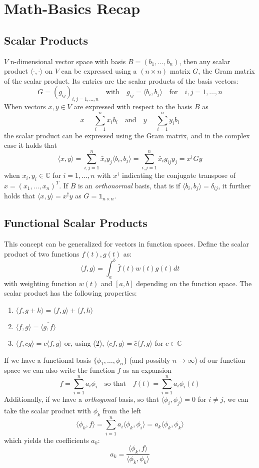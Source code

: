 \section*{Math-Basics Recap}
\subsection*{Scalar Products}
$V$ n-dimensional vector space with basis $B = (b_1, \dots, b_n)$, then any scalar product $\langle\cdot,\cdot\rangle$ on $V$ can be expressed using a $(n \times n)$ matrix $G$, the Gram matrix of the scalar product. Its entries are the scalar products of the basis vectors:
$$ G = (g_{ij})_{i,j=1,\dots,n} \quad \text{with} 
  \quad g_{ij} = \langle b_i, b_j \rangle \quad \text{for}
  \quad i,j = 1,\dots, n $$
When vectors $x,y \in V$ are expressed with respect to the basis $B$ as
$$ x = \sum_{i=1}^n x_i b_i \quad \text{and} \quad y = \sum_{i=1}^n y_i b_i $$
the scalar product can be expressed using the Gram matrix, and in the complex case it holds that
$$ \langle x, y \rangle = \sum^n_{i,j=1} \bar{x}_i y_j \langle b_i, b_j \rangle 
  =\sum^n_{i,j=1} \bar{x}_i g_{ij} y_j = x^\dagger G y$$
when $x_i,y_i \in \mathbb{C}$ for $i=1,\dots,n$ with $x^\dagger$ indicating the conjugate transpose of $x = (x_1, \dots, x_n)^T$. If $B$ is an \textit{orthonormal} basis, that is if $\langle b_i, b_j \rangle = \delta_{ij}$, it further holds that $\langle x,y \rangle = x^\dagger y$ as $G = \mathbb{1}_{n \times n}$.


\subsection*{Functional Scalar Products}
This concept can be generalized for vectors in function spaces. Define the scalar product of two functions $f(t), g(t)$ as:
$$ \langle f, g \rangle = \int_a^b \bar{f}(t) w(t) g(t) dt $$
with weighting function $w(t)$ and $[a,b]$ depending on the function space. The scalar product has the following properties:
\begin{enumerate}
    \item $\langle f, g + h \rangle = \langle f,g \rangle + \langle f,h \rangle$
    \item $\langle f, g \rangle = \overline{\langle g, f \rangle}$
    \item $\langle f, cg \rangle = c \langle f,g \rangle$ or, using (2),
        $\langle cf,g \rangle = \bar{c} \langle f,g \rangle$ for $c \in \mathbb{C}$
\end{enumerate}
If we have a functional basis $\{\phi_1, \dots , \phi_n\}$ (and possibly $n \to \infty$) of our function space we can also write the function $f$ as an expansion
$$ f = \sum_{i=1}^n a_i \phi_i \quad \text{so that} \quad
  f(t) = \sum_{i=1}^n a_i \phi_i (t)$$
Additionally, if we have a \textit{orthogonal} basis, so that $\langle \phi_i, \phi_j \rangle = 0$ for $i \neq j$, we can take the scalar product with $\phi_k$ from the left
$$ \langle \phi_k, f \rangle = \sum_{i=1}^n a_i \langle \phi_k, \phi_i \rangle =
  a_k \langle \phi_k, \phi_k \rangle $$
which yields the coefficients $a_k$: 
$$ a_k = \frac{\langle \phi_k, f \rangle}{\langle \phi_k, \phi_k \rangle}$$


